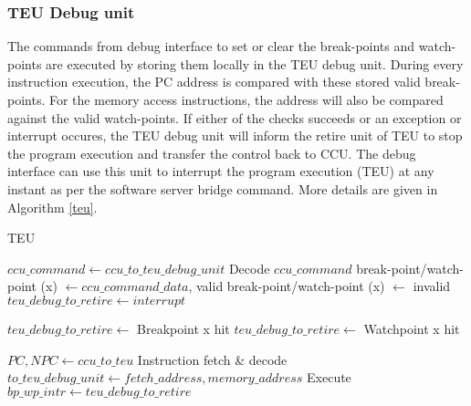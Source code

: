  \subsubsection{TEU Debug unit}
 The commands from debug interface to set or clear the break-points and watch-points are executed by storing them locally in the TEU debug unit.
 During every instruction execution, the PC address is compared with these stored valid break-points. For the memory access instructions, the address will also be compared against the valid watch-points. If either of the checks succeeds or an exception or interrupt occures, the TEU debug unit will inform the retire unit of TEU to stop the program execution and transfer the control back to CCU.  The debug interface can use this unit to interrupt the program execution (TEU) at any instant as per the software server bridge command. More details are given in Algorithm \ref{teu}.
  
 \begin{algorithm}
 	\caption{TEU}\label{teu}
 	\begin{algorithmic}[1]
	 		\State $ccu\_command \gets ccu\_to\_teu\_debug\_unit$
	 		\State Decode $ccu\_command$
		 		\State break-point/watch-point (x) $\gets ccu\_command\_data$, valid
			 	\State break-point/watch-point (x) $\gets$ invalid
				\State $teu\_debug\_to\_retire \gets interrupt$
	 		\EndIf
 		
		 		\State $teu\_debug\_to\_retire \gets $ Breakpoint x hit
	 		\EndIf
		 		\State $teu\_debug\_to\_retire \gets $ Watchpoint x hit
		 	\EndIf
 		\EndWhile
 		\EndFunction
 		
	 		\State $PC, NPC \gets ccu\_to\_teu$
		 		\State Instruction fetch \& decode
		 		\State $to\_teu\_debug\_unit \gets fetch\_address, memory\_address$
		 		\State Execute
		 		\State $bp\_wp\_intr \gets teu\_debug\_to\_retire$
		 	\EndWhile
	 	\EndWhile
 		\EndFunction
 	\end{algorithmic}
 \end{algorithm}